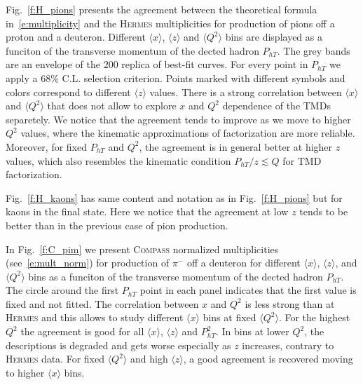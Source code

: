 \documentclass[aps,preprintnumbers,showpacs,nofootinbib,superscriptaddress,floatfix]{revtex4}
\newcommand{\hermes}{\textsc{Hermes }}
\newcommand{\compass}{\textsc{Compass }}
\begin{document}

Fig.~\ref{f:H_pions} presents the agreement between the theoretical formula in~\eqref{e:multiplicity} and the \hermes multiplicities for production of pions off a proton and a deuteron. 
Different $\langle x \rangle$, $\langle z \rangle$ and $\langle Q^2 \rangle$ bins are displayed as a funciton of the transverse momentum of the dected hadron $P_{hT}$.
The grey bands are an envelope of the $200$ replica of best-fit curves. For every point in $P_{hT}$ we apply a $68\%$ C.L. selection criterion. 
Points marked with different symbols and colors correspond to different $\langle z \rangle$ values. There is a strong correlation between $\langle x \rangle$ and $\langle Q^2 \rangle$ that does not allow to explore $x$ and $Q^2$ dependence of the TMDs separetely. 
We notice that the agreement tends to improve as we move to higher $Q^2$ values, where the kinematic approximations of factorization are more reliable. 
Moreover, for fixed $P_{hT}$ and $Q^2$, the agreement is in general better at higher $z$ values, which also resembles the kinematic condition $P_{hT}/z \lesssim Q$ for TMD factorization.

Fig.~\ref{f:H_kaons} has same content and notation as in Fig.~\ref{f:H_pions} but for kaons in the final state. Here we notice that the agreement at low $z$ tends to be better than in the previous case of pion production. 

In Fig.~\ref{f:C_pim} we present \compass normalized multiplicities (see~\eqref{e:mult_norm}) for production of $\pi^-$ off a deuteron for different $\langle x \rangle$, $\langle z \rangle$, and $\langle Q^2 \rangle$ bins as a funciton of the transverse momentum of the dected hadron $P_{hT}$. The circle around the first $P_{hT}$ point in each panel indicates that the first value is fixed and not fitted. 
The correlation between $x$ and $Q^2$ is less strong than at \hermes and this allows to study different $\langle x \rangle$ bins at fixed $\langle Q^2 \rangle$.
For the highest $Q^2$ the agreement is good for all $\langle x \rangle$, $\langle z \rangle$ and $P_{hT}^2$. In bins at lower $Q^2$, the descriptions is degraded and gets worse especially as $z$ increases, contrary to \hermes data. 
For fixed $\langle Q^2 \rangle$ and high $\langle z \rangle$, a good agreement is recovered moving to higher $\langle x \rangle$ bins.
\end{document}
